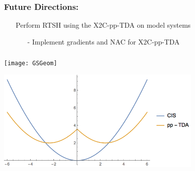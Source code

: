 \documentclass[usepdftitle=false,10pt]{beamer}
\begin{document}
\begin{frame}
  \frametitle{Future Directions:}
  \begin{itemize}
    \item[\ding{228}] Perform RTSH using the X2C-pp-TDA on model systems
    \begin{itemize}
      \item[-] Implement gradients and NAC for X2C-pp-TDA
    \end{itemize}
  \end{itemize}
  \vfill
\end{frame}
\begin{frame}
\frametitle{}
\hfill  \texttt{[image: GSGeom]}

\includegraphics[width=0.75\textwidth]{ppTDAPES} \hfill
\end{frame}
\end{document}
